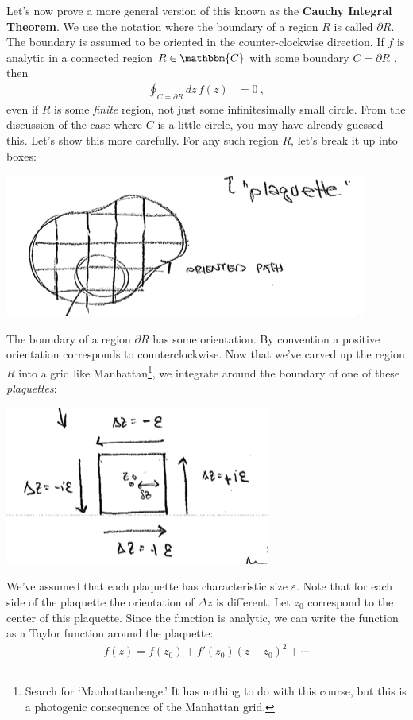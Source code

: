 \documentclass[
  11pt,
	colorful,
	raggedright,
]{tufte-style-thesis-flip}
\begin{document}
Let's now prove a more general version of this known as the \textbf{Cauchy Integral Theorem}. We use the notation where the boundary of a region $R$ is called $\partial R$. The boundary is assumed to be oriented in the counter-clockwise direction. If $f$ is analytic in a connected region $R \in \mathbbm{C}$ with some boundary $C = \partial R$ , then 
\begin{align}
  \oint_{C=\partial R} dz\, f(z) &= 0 \ ,
\end{align}
even if $R$ is some \emph{finite} region, not just some infinitesimally small circle. From the discussion of the case where $C$ is a little circle, you may have already guessed this. Let's show this more carefully. For any such region $R$, let's break it up into boxes:
\begin{center}
\includegraphics[width=.5\textwidth]{figures/Lec_2017_12_plaquette.png}
\end{center}
The boundary of a region $\partial R$ has some orientation. By convention a positive orientation corresponds to counterclockwise. Now that we've carved up the region $R$ into a grid like Manhattan\footnote{Search for `Manhattanhenge.' It has nothing to do with this course, but this is a photogenic consequence of the Manhattan grid.}, we integrate around the boundary of one of these \emph{plaquettes}:
\begin{center}
\includegraphics[width=.4\textwidth]{figures/Lec_2017_plaq_int.png}
\end{center}
We've assumed that each plaquette has characteristic size $\varepsilon$. Note that for each side of the plaquette the orientation of $\Delta z$ is different. Let $z_0$ correspond to the center of this plaquette. Since the function is analytic, we can write the function as a Taylor function around the plaquette:
\begin{align}
  f(z) = f(z_0) + f'(z_0) (z-z_0)^2 + \cdots
\end{align}
\end{document}
